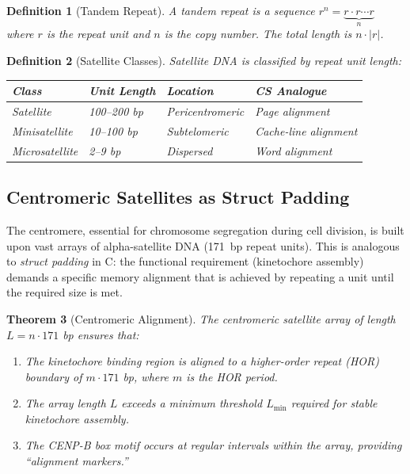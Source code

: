 \documentclass[12pt,a4paper]{article}
\newtheorem{theorem}{Theorem}[section]
\newtheorem{definition}[theorem]{Definition}
\begin{document}
\begin{definition}[Tandem Repeat]\label{def:tandem}
A \emph{tandem repeat} is a sequence $r^n = \underbrace{r \cdot r \cdots r}_{n}$
where $r$ is the repeat unit and $n$ is the copy number. The total length is $n \cdot |r|$.
\end{definition}

\begin{definition}[Satellite Classes]\label{def:sat-classes}
Satellite DNA is classified by repeat unit length:
\begin{center}
\begin{tabular}{@{}llll@{}}
\toprule
\textbf{Class} & \textbf{Unit Length} & \textbf{Location} & \textbf{CS Analogue} \\
\midrule
Satellite & 100--200 bp & Pericentromeric & Page alignment \\
Minisatellite & 10--100 bp & Subtelomeric & Cache-line alignment \\
Microsatellite & 2--9 bp & Dispersed & Word alignment \\
\bottomrule
\end{tabular}
\end{center}
\end{definition}

\subsection{Centromeric Satellites as Struct Padding}

The centromere, essential for chromosome segregation during cell division, is built upon
vast arrays of alpha-satellite DNA (171~bp repeat units). This is analogous to
\emph{struct padding} in C: the functional requirement (kinetochore assembly) demands a
specific memory alignment that is achieved by repeating a unit until the required size
is met.

\begin{theorem}[Centromeric Alignment]\label{thm:centromere}
The centromeric satellite array of length $L = n \cdot 171$ bp ensures that:
\begin{enumerate}[label=(\roman*)]
  \item The kinetochore binding region is aligned to a higher-order repeat (HOR)
    boundary of $m \cdot 171$ bp, where $m$ is the HOR period.
  \item The array length $L$ exceeds a minimum threshold $L_{\min}$ required for
    stable kinetochore assembly.
  \item The CENP-B box motif occurs at regular intervals within the array, providing
    ``alignment markers.''
\end{enumerate}
\end{theorem}
\end{document}
